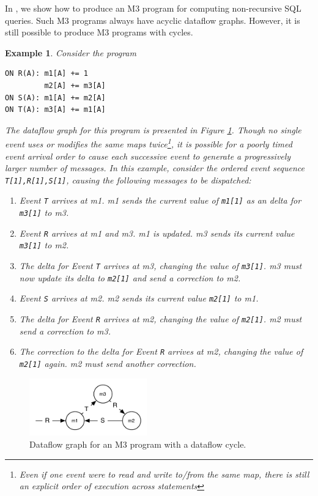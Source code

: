 \documentclass{vldb}
\newtheorem{example}[theorem]{Example}
\begin{document}
In \cite{dbtoaster-pods}, we show how to produce an M3 program for computing non-recursive SQL queries.  Such M3 programs always have acyclic dataflow graphs.  However, it is still possible to produce M3 programs with cycles.  

\begin{example}
\label{ex:cyclegraph}
Consider the program
\begin{verbatim}
ON R(A): m1[A] += 1
         m2[A] += m3[A]
ON S(A): m1[A] += m2[A]
ON T(A): m3[A] += m1[A]
\end{verbatim}
The dataflow graph for this program is presented in Figure \ref{fig:dataflowcycle}.  Though no single event uses or modifies the same maps twice\footnote{Even if one event were to read and write to/from the same map, there is still an explicit order of execution across statements}, it is possible for a poorly timed event arrival order to cause each successive event to generate a progressively larger number of messages.  In this example, consider the ordered event sequence \texttt{T[1],R[1],S[1]}, causing the following messages to be dispatched:
\begin{enumerate}
\item Event \texttt{T} arrives at m1.  m1 sends the current value of \texttt{m1[1]} as an delta for \texttt{m3[1]} to m3.
\item Event \texttt{R} arrives at m1 and m3.  m1 is updated.  m3 sends its current value \texttt{m3[1]} to m2.  
\item The delta for Event \texttt{T} arrives at m3, changing the value of \texttt{m3[1]}.  m3 must now update its delta to \texttt{m2[1]} and send a correction to m2.
\item Event \texttt{S} arrives at m2.  m2 sends its current value \texttt{m2[1]} to m1.  
\item The delta for Event \texttt{R} arrives at m2, changing the value of \texttt{m2[1]}.  m2 must send a correction to m3.
\item The correction to the delta for Event \texttt{R} arrives at m2, changing the value of \texttt{m2[1]} again.  m2 must send another correction.
\end{enumerate}
\end{example}

\begin{figure}
\begin{center}
\includegraphics[width=2in]{graphics/cycle_graph}
\end{center}
\caption{Dataflow graph for an M3 program with a dataflow cycle.}
\label{fig:dataflowcycle}
\end{figure}
\end{document}
